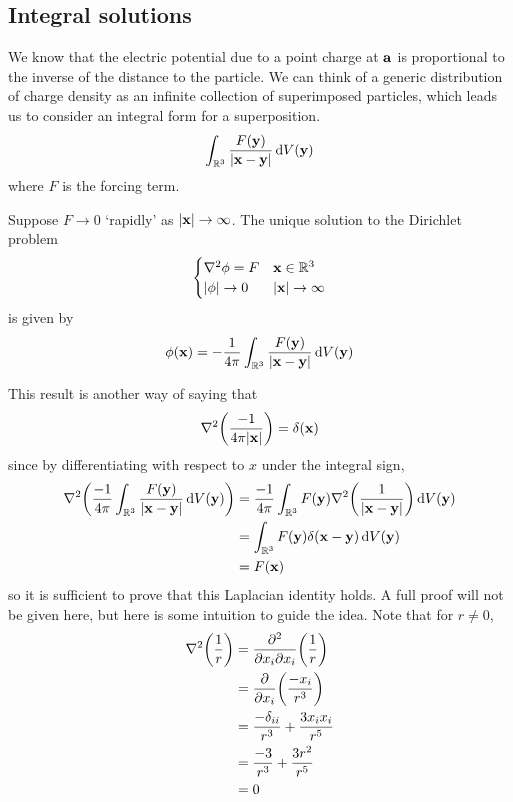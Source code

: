 \subsection{Integral solutions}
We know that the electric potential due to a point charge at \(\vb a\) is proportional to the inverse of the distance to the particle.
We can think of a generic distribution of charge density as an infinite collection of superimposed particles, which leads us to consider an integral form for a superposition.
\[
	\int_{\mathbb R^3} \frac{F(\vb y)}{\abs{\vb x - \vb y}} \dd{V(\vb y)}
\]
where \(F\) is the forcing term.
\begin{proposition}
	Suppose \(F \to 0\) `rapidly' as \(\abs{\vb x} \to \infty\).
	The unique solution to the Dirichlet problem
	\[
		\begin{cases}
			\laplacian{\phi} = F & \vb x \in \mathbb R^3   \\
			\abs{\phi} \to 0     & \abs{\vb{x}} \to \infty
		\end{cases}
	\]
	is given by
	\[
		\phi(\vb x) = -\frac{1}{4\pi}\int_{\mathbb R^3} \frac{F(\vb y)}{\abs{\vb x - \vb y}} \dd{V(\vb y)}
	\]
\end{proposition}
\noindent This result is another way of saying that
\[
	\laplacian(\frac{-1}{4\pi\abs{\vb x}}) = \delta(\vb x)
\]
since by differentiating with respect to \(x\) under the integral sign,
\begin{align*}
	\laplacian(\frac{-1}{4\pi} \int_{\mathbb R^3} \frac{F(\vb y)}{\abs{\vb x - \vb y}} \dd{V(\vb y)}) & = \frac{-1}{4\pi} \int_{\mathbb R^3} F(\vb y) \laplacian(\frac{1}{\abs{\vb x - \vb y}}) \dd{V(\vb y)} \\
	                                                                                                  & = \int_{\mathbb R^3} F(\vb y) \delta(\vb x - \vb y) \dd{V(\vb y)}                                     \\
	                                                                                                  & = F(\vb x)
\end{align*}
\noindent so it is sufficient to prove that this Laplacian identity holds.
A full proof will not be given here, but here is some intuition to guide the idea.
Note that for \(r \neq 0\),
\begin{align*}
	\laplacian(\frac{1}{r}) & = \pdv{}{x_i}{x_i} \qty(\frac{1}{r})              \\
	                        & = \pdv{x_i} \qty(\frac{-x_i}{r^3})                \\
	                        & = \frac{-\delta_{ii}}{r^3} + \frac{3x_i x_i}{r^5} \\
	                        & = \frac{-3}{r^3} + \frac{3r^2}{r^5}               \\
	                        & = 0
\end{align*}
